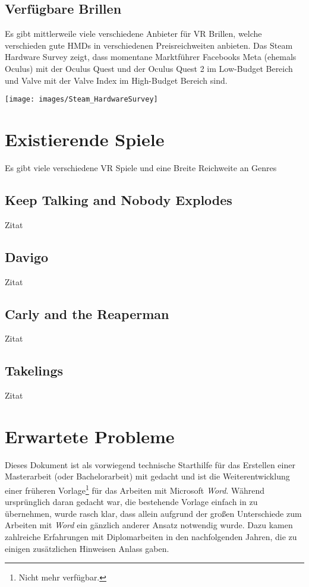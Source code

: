 \subsection{Verfügbare Brillen}
Es gibt mittlerweile viele verschiedene Anbieter für VR Brillen, welche verschieden gute HMDs in verschiedenen Preisreichweiten anbieten.
Das Steam Hardware Survey zeigt, dass momentane Marktführer Facebooks Meta (ehemals Oculus) mit der Oculus Quest und der Oculus Quest 2 im Low-Budget Bereich und Valve mit der Valve Index im High-Budget Bereich sind.

\texttt{[image: images/Steam\_HardwareSurvey]}

\section{Existierende Spiele}
Es gibt viele verschiedene VR Spiele und eine Breite Reichweite an Genres

\subsection{Keep Talking and Nobody Explodes}
Zitat \cite{bobsch 123 bobsch}

\subsection{Davigo}
Zitat \cite{bobsch 123 bobsch}

\subsection{Carly and the Reaperman}
Zitat \cite{bobsch 123 bobsch}

\subsection{Takelings}
Zitat \cite{bobsch 123 bobsch}

\section{Erwartete Probleme}
Dieses Dokument ist als vorwiegend technische Starthilfe für das
Erstellen einer Masterarbeit (oder Bachelorarbeit) mit \latex
gedacht und ist die Weiterentwicklung einer früheren
Vorlage\footnote{Nicht mehr verfügbar.} für das Arbeiten mit
Microsoft \emph{Word}. Während ursprünglich daran gedacht war, die
bestehende Vorlage einfach in \latex zu übernehmen, wurde rasch
klar, dass allein aufgrund der großen Unterschiede zum Arbeiten
mit \emph{Word} ein gänzlich anderer Ansatz notwendig wurde. Dazu
kamen zahlreiche Erfahrungen mit Diplomarbeiten in den
nachfolgenden Jahren, die zu einigen zusätzlichen Hinweisen Anlass gaben.

